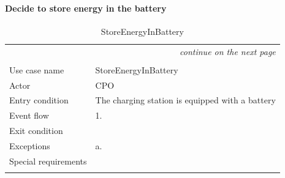 \paragraph{Decide to store energy in the battery}
\begin{center}
    \begin{longtable}{p{4cm} p{11cm}}
    \multicolumn{2}{r}{\itshape{continue on the next page}}\\
    \endfoot 
    \\
    \endlastfoot
    \hline
     Use case name &  StoreEnergyInBattery\\
     \hline
     Actor & CPO \\
     \hline
     Entry condition & The charging station is equipped with a battery  \\
     \hline
     Event flow &   1.
     \\
     \hline
     Exit condition &  \\
     \hline
     Exceptions &   a.\\
     \hline
     Special requirements & \\
     \hline
    \caption{StoreEnergyInBattery}
    \label{tab:StoreEnergyInBattery}
    \end{longtable}
\end{center}
\clearpage